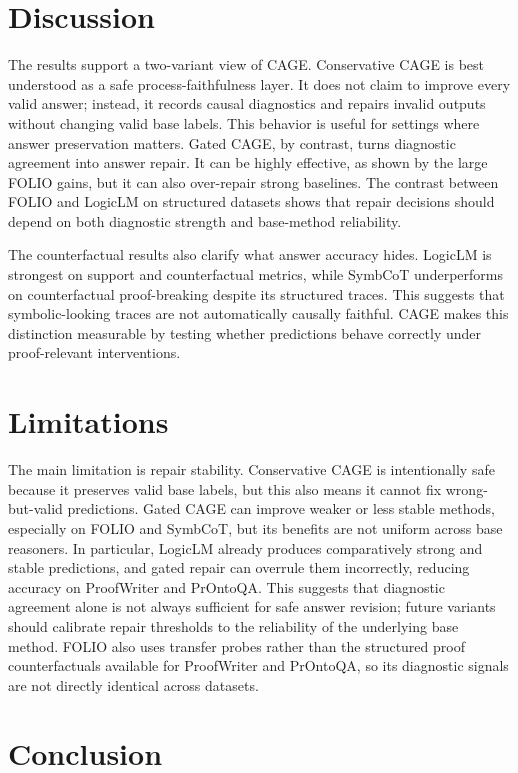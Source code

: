 \documentclass{article}
\begin{document}
\FloatBarrier
\section{Discussion}

The results support a two-variant view of CAGE. Conservative CAGE is best understood as a safe process-faithfulness layer. It does not claim to improve every valid answer; instead, it records causal diagnostics and repairs invalid outputs without changing valid base labels. This behavior is useful for settings where answer preservation matters. Gated CAGE, by contrast, turns diagnostic agreement into answer repair. It can be highly effective, as shown by the large FOLIO gains, but it can also over-repair strong baselines. The contrast between FOLIO and LogicLM on structured datasets shows that repair decisions should depend on both diagnostic strength and base-method reliability.

The counterfactual results also clarify what answer accuracy hides. LogicLM is strongest on support and counterfactual metrics, while SymbCoT underperforms on counterfactual proof-breaking despite its structured traces. This suggests that symbolic-looking traces are not automatically causally faithful. CAGE makes this distinction measurable by testing whether predictions behave correctly under proof-relevant interventions.

\section{Limitations}

The main limitation is repair stability. Conservative CAGE is intentionally safe because it preserves valid base labels, but this also means it cannot fix wrong-but-valid predictions. Gated CAGE can improve weaker or less stable methods, especially on FOLIO and SymbCoT, but its benefits are not uniform across base reasoners. In particular, LogicLM already produces comparatively strong and stable predictions, and gated repair can overrule them incorrectly, reducing accuracy on ProofWriter and PrOntoQA. This suggests that diagnostic agreement alone is not always sufficient for safe answer revision; future variants should calibrate repair thresholds to the reliability of the underlying base method. FOLIO also uses transfer probes rather than the structured proof counterfactuals available for ProofWriter and PrOntoQA, so its diagnostic signals are not directly identical across datasets.

\section{Conclusion}
\end{document}
